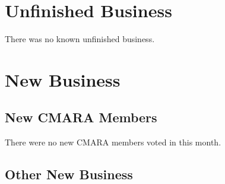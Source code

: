 \documentclass[10pt,letterpaper]{article}
\begin{document}
\section{Unfinished Business}
There was no known unfinished business.

\section{New Business}

\subsection{New CMARA Members}
\label{new-cmara-members}
There were no new CMARA members voted in this month.


\subsection{Other New Business}
\end{document}
